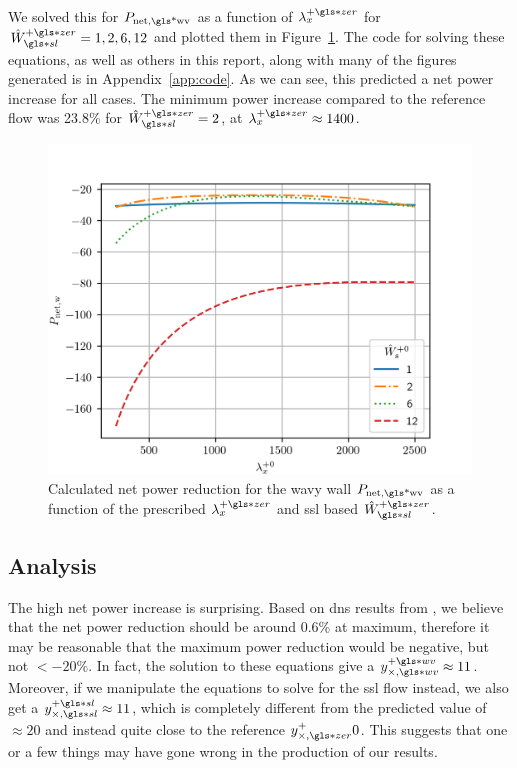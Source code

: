 We solved this for $P_\text{net,\gls*{wv}} $ as a function of $\lambda_x\pz$ for $\hat{W}\ssl\pz=1,2,6,12$ and plotted them in Figure~\ref{fig:pnetww}. The code for solving these equations, as well as others in this report, along with many of the figures generated is in Appendix~\ref{app:code}. As we can see, this predicted a net power increase for all cases. The minimum power increase compared to the reference flow was 23.8\% for $\hat{W}\ssl\pz=2$, at $\lambda_x\pz\approx1400$.
\begin{figure}[htbp]
	\centering
	\includegraphics[width=0.7\linewidth]{project/fig/pnetww.png}
	\caption[Net power reduction for the wavy wall $P_\text{net,w}$]{Calculated net power reduction for the wavy wall $P_\text{net,\gls*{wv}} $ as a function of the prescribed $\lambda_x\pz$ and \gls*{ssl} based $\hat{W}\ssl\pz$.}
	\label{fig:pnetww}
\end{figure}

\subsection{Analysis}
The high net power increase is surprising. Based on \gls*{dns} results from \sgt, we believe that the net power reduction should be around 0.6\% at maximum, therefore it may be reasonable that the maximum power reduction would be negative, but not $<-20\%$. In fact, the solution to these equations give a $y_{\times,\gls*{wv}}\pw\approx 11$. Moreover, if we manipulate the equations to solve for the \gls*{ssl} flow instead, we also get a $y_{\times,\gls*{sl}}\ps\approx11$, which is completely different from the predicted value of $\approx20$ and instead quite close to the reference $y_{\times,\gls*{zer}}\p0$. This suggests that one or a few things may have gone wrong in the production of our results.

